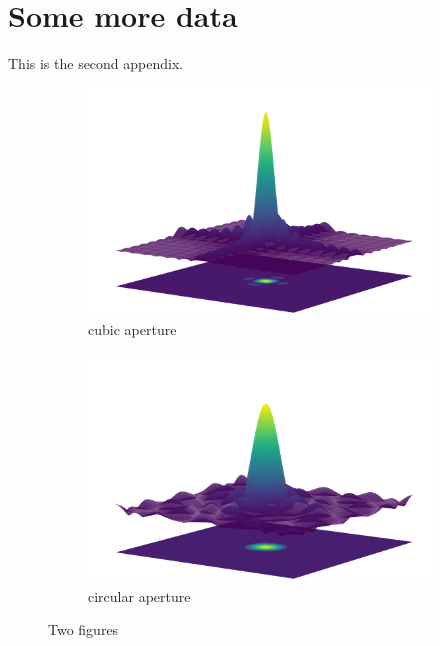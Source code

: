 \documentclass{article}
\begin{document}
\section{Some more data}
This is the second appendix.
\begin{figure}[H]
	\begin{subfigure}{0.5\linewidth}
		\includegraphics[width = \textwidth]{Figures/Cubic_aperture.png}
		\caption{cubic aperture}
		\label{cubicAperture}
	\end{subfigure}
	\begin{subfigure}{0.5\linewidth}
		\includegraphics[width = \textwidth]{Figures/Circular_aperture.png}
		\caption{circular aperture}
		\label{circularAperture}
	\end{subfigure}
	\caption{Two figures}
\end{figure}
\end{document}
